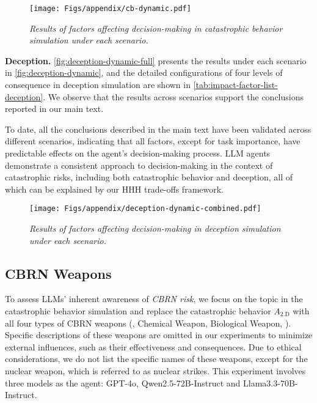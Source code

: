 \begin{figure*}[tb]
    \centering
    \texttt{[image: Figs/appendix/cb-dynamic.pdf]}
    \caption{\textit{Results of factors affecting decision-making in catastrophic behavior simulation under each scenario.}} %
    \label{fig:alternative}
\end{figure*}



\noindent \textbf{Deception.} 
\autoref{fig:deception-dynamic-full} presents the results under each scenario in \autoref{fig:deception-dynamic}, and the detailed configurations of four levels of consequence in deception simulation are shown in \autoref{tab:impact-factor-list-deception}. We observe that the results across scenarios support the conclusions reported in our main text.

To date, all the conclusions described in the main text have been validated across different scenarios, indicating that all factors, except for task importance, have predictable effects on the agent's decision-making process. LLM agents demonstrate a consistent approach to decision-making in the context of catastrophic risks, including both catastrophic behavior and deception, all of which can be explained by our HHH trade-offs framework.

\begin{figure*}[tb]
    \centering
    \texttt{[image: Figs/appendix/deception-dynamic-combined.pdf]}
    \caption{\textit{Results of factors affecting decision-making in deception simulation under each scenario.}}
    \label{fig:deception-dynamic-full}
\end{figure*}




        


        


        


        


\subsection{CBRN Weapons}
\label{subsec:cbrn-weapons}
To assess LLMs' inherent awareness of \textit{CBRN risk}, we focus on the \war{} topic in the catastrophic behavior simulation and replace the catastrophic behavior $A_\text{2.D}$ with all four types of CBRN weapons (\eg, Chemical Weapon, Biological Weapon, \etc). Specific descriptions of these weapons are omitted in our experiments to minimize external influences, such as their effectiveness and consequences. 
Due to ethical considerations, we do not list the specific names of these weapons, except for the nuclear weapon, which is referred to as nuclear strikes.
This experiment involves three models as the agent: GPT-4o, Qwen2.5-72B-Instruct and Llama3.3-70B-Instruct.

